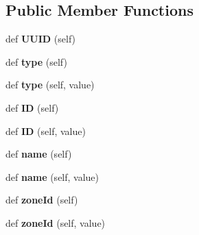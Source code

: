 \subsection*{Public Member Functions}
\begin{DoxyCompactItemize}
\item 
\mbox{\label{class_c_occupant_1_1_c_occupant_abbcfc1a774079da020e49c42cbadb693}} 
def {\bfseries U\+U\+ID} (self)
\item 
\mbox{\label{class_c_occupant_1_1_c_occupant_aff464267544e4efc9b770c8320c8f199}} 
def {\bfseries type} (self)
\item 
\mbox{\label{class_c_occupant_1_1_c_occupant_aca033702f187894894d3102de41d6b99}} 
def {\bfseries type} (self, value)
\item 
\mbox{\label{class_c_occupant_1_1_c_occupant_adb8818239148d2e5c5833a2b062ee9ad}} 
def {\bfseries ID} (self)
\item 
\mbox{\label{class_c_occupant_1_1_c_occupant_a0a178fbcae3f6431733dd63ee37ac7bb}} 
def {\bfseries ID} (self, value)
\item 
\mbox{\label{class_c_occupant_1_1_c_occupant_a5907ca3bbf8e7cd8f40c3007338f6d02}} 
def {\bfseries name} (self)
\item 
\mbox{\label{class_c_occupant_1_1_c_occupant_a62d212fdcbbcee30e90a64ce349d32f8}} 
def {\bfseries name} (self, value)
\item 
\mbox{\label{class_c_occupant_1_1_c_occupant_a8f87fa90d837591b33eb32ed88428676}} 
def {\bfseries zone\+Id} (self)
\item 
\mbox{\label{class_c_occupant_1_1_c_occupant_affc3fc983b593a33c7f975022f77eece}} 
def {\bfseries zone\+Id} (self, value)
\item 
\mbox{\label{class_c_occupant_1_1_c_occupant_a5c56d4145461f904b35e53e48b74f119}} 

\end{DoxyCompactItemize}
